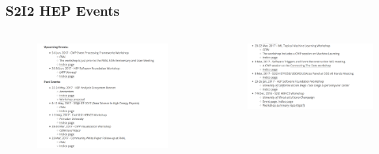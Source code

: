 \begin{frame}
\frametitle{S2I2 HEP Events}

\begin{columns}[T] %

\begin{column}{.50\textwidth}
\begin{figure}[htbp]
\begin{center}
\includegraphics[width=1.0\textwidth]{images/s2i2-hep-events-1.png}
\end{center}
\end{figure}
\end{column}%

\begin{column}{.50\textwidth}
\begin{figure}[htbp]
\begin{center}
\includegraphics[width=1.0\textwidth]{images/s2i2-hep-events-2.png}
\end{center}
\end{figure}
\end{column}%




\end{columns}


\end{frame}


